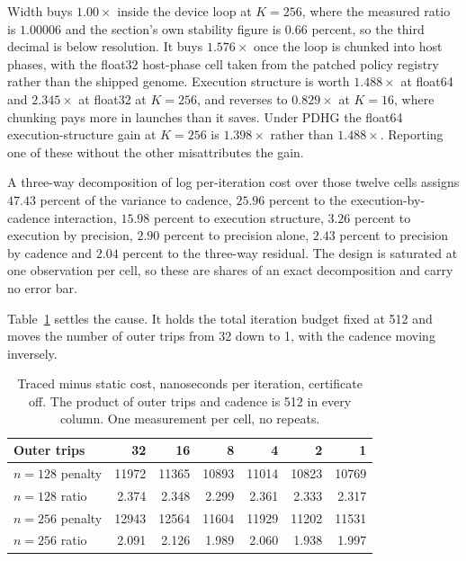 Width buys $1.00\times$ inside the device loop at $K=256$, where the measured
ratio is $1.00006$ and the section's own stability figure is $0.66$ percent, so
the third decimal is below resolution. It buys $1.576\times$ once the loop is
chunked into host phases, with the float32 host-phase cell taken from the
patched policy registry rather than the shipped genome. Execution structure is
worth $1.488\times$ at float64 and $2.345\times$ at float32 at $K=256$, and
reverses to $0.829\times$ at $K=16$, where chunking pays more in launches than
it saves. Under PDHG the float64 execution-structure gain at $K=256$ is
$1.398\times$ rather than $1.488\times$. Reporting one of these without the
other misattributes the gain.

A three-way decomposition of log per-iteration cost over those twelve cells
assigns $47.43$ percent of the variance to cadence, $25.96$ percent to the
execution-by-cadence interaction, $15.98$ percent to execution structure,
$3.26$ percent to execution by precision, $2.90$ percent to precision alone,
$2.43$ percent to precision by cadence and $2.04$ percent to the three-way
residual. The design is saturated at one observation per cell, so these are
shares of an exact decomposition and carry no error bar.

Table~\ref{tab:loopmech} settles the cause. It holds the total iteration budget
fixed at 512 and moves the number of outer trips from 32 down to 1, with the
cadence moving inversely.

\begin{table}[t]
\centering
\caption{Traced minus static cost, nanoseconds per iteration, certificate off.
The product of outer trips and cadence is 512 in every column. One measurement
per cell, no repeats.}
\label{tab:loopmech}
\begin{tabular}{@{}lrrrrrr@{}}
\toprule
Outer trips & 32 & 16 & 8 & 4 & 2 & 1 \\
\midrule
$n=128$ penalty & 11972 & 11365 & 10893 & 11014 & 10823 & 10769 \\
$n=128$ ratio   & 2.374 & 2.348 & 2.299 & 2.361 & 2.333 & 2.317 \\
$n=256$ penalty & 12943 & 12564 & 11604 & 11929 & 11202 & 11531 \\
$n=256$ ratio   & 2.091 & 2.126 & 1.989 & 2.060 & 1.938 & 1.997 \\
\bottomrule
\end{tabular}
\end{table}

